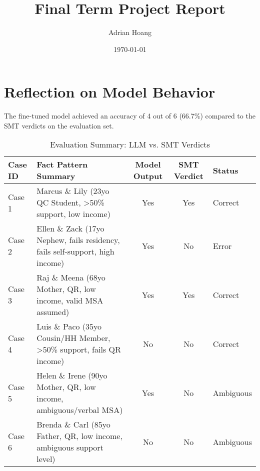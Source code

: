 \documentclass[11pt, letterpaper]{article}
\title{Final Term Project Report}
\author{Adrian Hoang}
\date{\today} %
\begin{document}
\maketitle %
\section{Reflection on Model Behavior}

The fine-tuned model achieved an accuracy of 4 out of 6 (66.7\%) compared to the SMT verdicts on the evaluation set.

\begin{table}[htbp] %
 \centering
 \caption{Evaluation Summary: LLM vs. SMT Verdicts}
 \label{tab:summary}
 \begin{tabularx}{\textwidth}{@{} l >{\RaggedRight}X c c l @{}}
  \toprule
  \textbf{Case ID} & \textbf{Fact Pattern Summary}                 & \textbf{Model Output} & \textbf{SMT Verdict} & \textbf{Status} \\
  \midrule
  Case 1  & Marcus \& Lily (23yo QC Student, >50\% support, low income)           & Yes          & Yes         & Correct \\ \addlinespace %
  Case 2  & Ellen \& Zack (17yo Nephew, fails residency, fails self-support, high income)            & Yes          & No          & Error   \\ \addlinespace
  Case 3  & Raj \& Meena (68yo Mother, QR, low income, valid MSA assumed)                 & Yes          & Yes         & Correct \\ \addlinespace
  Case 4  & Luis \& Paco (35yo Cousin/HH Member, >50\% support, fails QR income)         & No           & No          & Correct \\ \addlinespace
  Case 5  & Helen \& Irene (90yo Mother, QR, low income, ambiguous/verbal MSA)        & Yes          & No          & Ambiguous   \\ \addlinespace
  Case 6  & Brenda \& Carl (85yo Father, QR, low income, ambiguous support level) & No           & No          & Ambiguous \\
  \bottomrule
 \end{tabularx}
\end{table}
\end{document}
